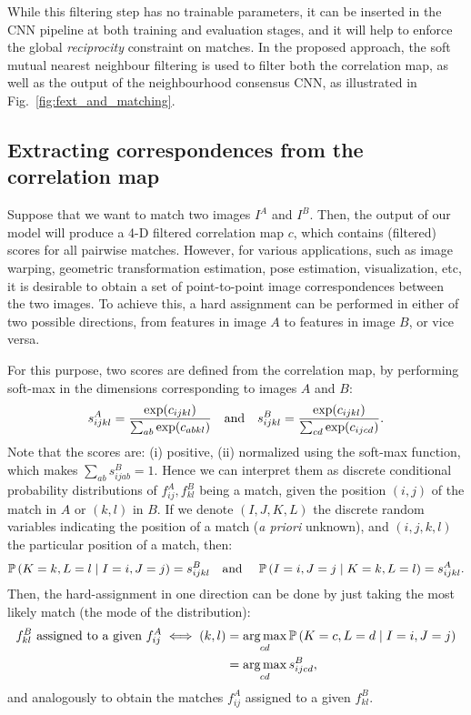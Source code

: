 \documentclass{article}
\DeclareMathOperator*{\argmax}{arg\,max}
\begin{document}
While this filtering step has no trainable parameters, it can be inserted in the CNN pipeline at both training and evaluation stages, and it will help to enforce the global \emph{reciprocity} constraint on matches. In the proposed approach, the soft mutual nearest neighbour filtering is used to filter both the correlation map, as well as the output of the neighbourhood consensus CNN, as illustrated in Fig.~\ref{fig:fext_and_matching}.

\subsection{Extracting correspondences from the correlation map \label{sec:match_assignment}}
Suppose that we want to match two images $I^A$ and $I^B$. Then, the output of our model will produce a 4-D filtered correlation map $c$, which contains (filtered) scores for all pairwise matches. However, for various applications, such as image warping, geometric transformation estimation, pose estimation, visualization, etc, it is desirable to obtain a set of point-to-point image correspondences between the two images.
To achieve this, a hard assignment can be performed in either of two possible directions, from features in image $A$ to features in image $B$, or vice versa.

For this purpose, two scores are defined from the correlation map, by performing soft-max in the dimensions corresponding to images $A$ and $B$:
\begin{equation}
    s^{A}_{ijkl}=\frac{\exp(c_{ijkl})}
    {\sum_{ab} \exp(c_{abkl})}
    \text{\quad and\quad}
    s^{B}_{ijkl}=\frac{\exp(c_{ijkl})}
    {\sum_{cd} \exp(c_{ijcd})}.
    \label{eq:softmax}
\end{equation}
Note that the scores are: (i) positive, (ii) normalized using the soft-max function, which makes $\sum_{ab} s^{B}_{ijab}=1$. Hence we can interpret them as discrete conditional probability distributions of $f^A_{ij},f^B_{kl}$ being a match, given the position $(i,j)$ of the match in $A$ or $(k,l)$ in $B$. If we denote $(I,J,K,L)$ the discrete random variables indicating the position of a match (\emph{a priori} unknown), and $(i,j,k,l)$ the particular position of a match, then:
\begin{equation}
\mathbb{P}\left(K=k,L=l\mid I=i,J=j\right)=s^B_{ijkl}\text{\quad and \quad}\mathbb{P}\left(I=i,J=j \mid K=k,L=l \right)=s^A_{ijkl}.
\label{eq:prob_dist}
\end{equation}
Then, the hard-assignment in one direction can be done by just taking the most likely match (the mode of the distribution):
\begin{equation}
\begin{split}
     f^B_{kl}\text{\,\,assigned to a given\,\,} f^A_{ij} \iff (k,l)& =
      \argmax_{cd} \mathbb{P}\left(K=c,L=d\mid I=i,J=j\right) \\
      &= \argmax_{cd} s^B_{ijcd},
     \label{eq:hard_assign}
\end{split}
\end{equation}
and analogously to obtain the matches $f^A_{ij}$ assigned to a given $f^B_{kl}$.
\end{document}
